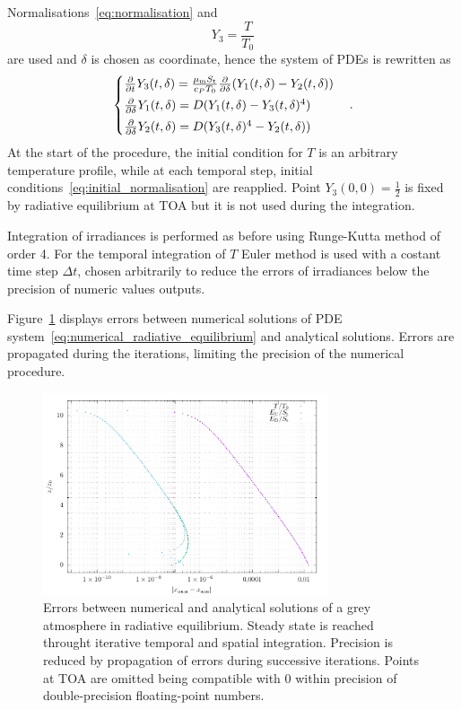 \documentclass[a4paper,10pt,twocolumn,\classoptions]{article}
\begin{document}
Normalisations~\eqref{eq:normalisation} and
\begin{equation}
  \label{eq:temperature_normalisation}
  Y_3 = \frac{T}{T_0}
\end{equation}
are used and $\delta$ is chosen as coordinate, hence the system of PDEs is rewritten as
\begin{equation}
  \label{eq:numerical_radiative_equilibrium}
  \left\{
  \begin{array}{@{}l@{}}
    \pdv*{Y_3(t, \delta)}{t} = \frac{\mu_\text{m} S_\text{t}}{c_P T_0} \pdv*{(Y_1(t, \delta) - Y_2(t, \delta))}{\delta} \\[0.5em]
    \pdv*{Y_1(t, \delta)}{\delta} = D (Y_1(t, \delta) - Y_3(t, \delta)^4) \\[0.5em]
    \pdv*{Y_2(t, \delta)}{\delta} = D (Y_3(t, \delta)^4 - Y_2(t, \delta))
  \end{array}
  \right.
  \quad .
\end{equation}
At the start of the procedure, the initial condition for $T$ is an arbitrary temperature profile, while at each temporal step, initial conditions~\eqref{eq:initial_normalisation} are reapplied. Point $Y_3(0, 0) = \frac{1}{2}$ is fixed by radiative equilibrium at TOA but it is not used during the integration.

Integration of irradiances is performed as before using Runge-Kutta method of order 4. For the temporal integration of $T$ Euler method is used with a costant time step $\Delta t$, chosen arbitrarily to reduce the errors of irradiances below the precision of numeric values outputs.

Figure~\ref{fig:errors_PDE} displays errors between numerical solutions of PDE system~\eqref{eq:numerical_radiative_equilibrium} and analytical solutions. Errors are propagated during the iterations, limiting the precision of the numerical procedure.
\begin{figure}[h]
  \centering
  \includegraphics*[keepaspectratio=true,width=0.75\textwidth]{errors_PDE}
  \caption{Errors between numerical and analytical solutions of a grey atmosphere in radiative equilibrium. Steady state is reached throught iterative temporal and spatial integration. Precision is reduced by propagation of errors during successive iterations. Points at TOA are omitted being compatible with 0 within precision of double-precision floating-point numbers.}
  \label{fig:errors_PDE}
\end{figure}
\end{document}
